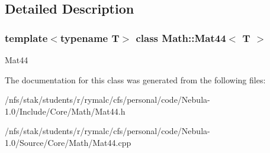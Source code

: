 \subsection{Detailed Description}
\subsubsection*{template$<$typename T$>$ class Math::Mat44$<$ T $>$}

Mat44 

The documentation for this class was generated from the following files:\begin{DoxyCompactItemize}
\item 
/nfs/stak/students/r/rymalc/cfs/personal/code/Nebula-\/1.0/Include/Core/Math/Mat44.h\item 
/nfs/stak/students/r/rymalc/cfs/personal/code/Nebula-\/1.0/Source/Core/Math/Mat44.cpp\end{DoxyCompactItemize}
